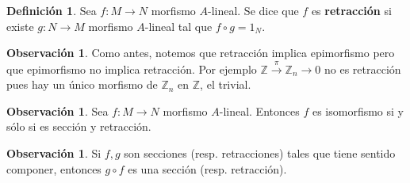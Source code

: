 \documentclass[12pt]{book}
\theoremstyle{definition}
\newtheorem{obs}[teo]{Observación}
\newtheorem{defn}[teo]{Definición}
\newcommand{\ZZ}{\mathbb{Z}}      %
\begin{document}
\begin{defn}
Sea $f:M\to N$ morfismo $A$-lineal. Se dice que $f$ es \textbf{retracción} si existe $g:N\to M$ morfismo $A$-lineal tal que $f\circ g = 1_N$.
\end{defn}

\begin{obs}
Como antes, notemos que retracción implica epimorfismo pero que epimorfismo no implica retracción. Por ejemplo $\ZZ\stackrel{\pi}{\longrightarrow}\ZZ_n\longrightarrow 0$ no es retracción pues hay un único morfismo de $\ZZ_n$ en $\ZZ$, el trivial.
\end{obs}

\begin{obs}
Sea $f:M\to N$ morfismo $A$-lineal. Entonces $f$ es isomorfismo si y sólo si es sección y retracción.
\end{obs}

\begin{obs}
Si $f,g$ son secciones (resp. retracciones) tales que tiene sentido componer, entonces $g\circ f$ es una sección (resp. retracción).
\end{obs}
\end{document}
